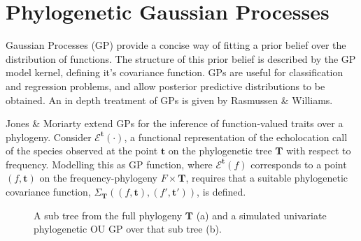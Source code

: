 \documentclass{ws-rv9x6}
\begin{document}
\section{Phylogenetic Gaussian Processes}
\label{sec:pgp}
Gaussian Processes (GP) provide a concise way of fitting a prior belief over the distribution of functions. The structure of this prior belief is described by the GP model kernel, defining it's covariance function. GPs are useful for classification and regression problems, and allow posterior predictive distributions to be obtained.  An in depth treatment of GPs is given by Rasmussen \& Williams.\cite{rasmussen2006gaussian}  

Jones \& Moriarty\cite{jones2013evolutionary} extend GPs for the inference of function-valued traits over a phylogeny. Consider \(\mathcal{E}^{\mathbf{t}}(\cdot)\), a functional representation of the echolocation call of the species observed at the point \(\mathbf{t}\) on the phylogenetic tree \(\mathbf{T}\) with respect to frequency. Modelling this as GP function, where \(\mathcal{E}^{\mathbf{t}}(f)\) corresponds to a point \((f, \mathbf{t})\) on the frequency-phylogeny \(F \times \mathbf{T}\), requires that a suitable phylogenetic covariance function, \(\Sigma_{\mathbf{T}}\left((f,\mathbf{t}), (f',\mathbf{t}')\right)\), is defined.

\begin{figure}[h]
	\caption{A sub tree from the full phylogeny \(\mathbf{T}\) (a) and a simulated univariate phylogenetic OU GP over that sub tree (b).}
	\label{fig:subtree}
\end{figure}
\end{document}
